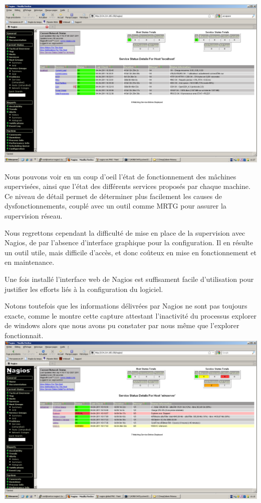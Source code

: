 \documentclass[a4paper]{article}
\begin{document}
\includegraphics[width=\linewidth]{nagios-lin.PNG}

Nous pouvons voir en un coup d'oeil l'état de fonctionnement des mâchines supervisées, ainsi que l'état des différents services proposés par chaque machine. Ce niveau de détail permet de déterminer plus facilement les causes de dysfonctionnements, couplé avec un outil comme MRTG pour assurer la supervision réseau.

Nous regrettons cependant la difficulté de mise en place de la supervision avec Nagios, de par l'absence d'interface graphique pour la configuration. Il en résulte un outil utile, mais difficile d'accès, et donc coûteux en mise en fonctionnement et en maintenance.

Une fois installé l'interface web de Nagios est suffisament facile d'utilisation pour justifier les efforts liés à la configuration du logiciel.

Notons toutefois que les informations délivrées par Nagios ne sont pas toujours exacte, comme le montre cette capture attestant l'inactivité du processus explorer de windows alors que nous avons pu constater par nous même que l'explorer fonctionnait.  ~\\

\includegraphics[width=0.7\linewidth]{nagios-win.PNG}
\end{document}
